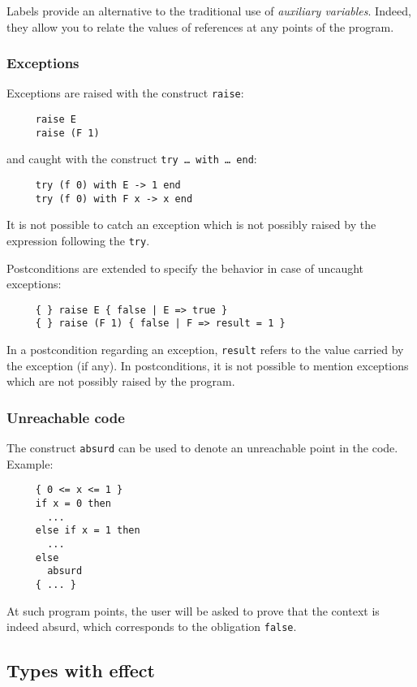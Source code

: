 \documentclass[a4paper,12pt]{report}
\makeatletter
\newcommand{\indextt}[1]{\index{#1@\texttt{#1}}}
\makeatother
\begin{document}
Labels provide an alternative to the traditional use of
\emph{auxiliary variables}. Indeed, they
allow you to relate the values of references at any points of the
program. 


\subsubsection{Exceptions}
\label{exception}

Exceptions are raised with the construct \texttt{raise}:
\begin{verbatim}
     raise E
     raise (F 1)
\end{verbatim}
and caught with the construct \texttt{try \dots\ with \dots\ end}:
\begin{verbatim}
     try (f 0) with E -> 1 end 
     try (f 0) with F x -> x end
\end{verbatim}
It is not possible to catch an exception which is not possibly raised
by the expression following the \texttt{try}.

Postconditions are extended to specify the behavior in case of
uncaught exceptions:
\begin{verbatim}
     { } raise E { false | E => true }
     { } raise (F 1) { false | F => result = 1 }
\end{verbatim}
In a postcondition regarding an exception, \texttt{result} refers to
the value carried by the exception (if any).
In postconditions, it is not possible to mention exceptions which
are not possibly raised by the program.


\subsubsection{Unreachable code}
\label{absurd}\indextt{absurd}

The construct \texttt{absurd} can be used to denote an unreachable
point in the code. Example:
\begin{verbatim}
     { 0 <= x <= 1 }
     if x = 0 then 
       ...
     else if x = 1 then 
       ...
     else 
       absurd
     { ... }
\end{verbatim}
At such program points, the user will be asked to prove that the
context is indeed absurd, which corresponds to the obligation \texttt{false}.

\subsection{Types with effect}
\label{types}
\end{document}
